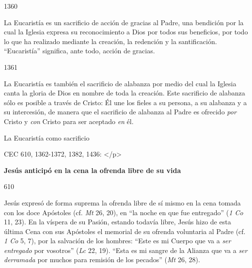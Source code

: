 			\begin{ccebody}\begin{ccenumber}1360\end{ccenumber} La Eucaristía es un sacrificio de acción de gracias al Padre, una bendición por la cual la Iglesia expresa su reconocimiento a Dios por todos sus beneficios, por todo lo que ha realizado mediante la creación, la redención y la santificación. “Eucaristía” significa, ante todo, acción de gracias.\end{ccebody}
			
			\begin{ccebody}\begin{ccenumber}1361\end{ccenumber} La Eucaristía es también el sacrificio de alabanza por medio del cual la Iglesia canta la gloria de Dios en nombre de toda la creación. Este sacrificio de alabanza sólo es posible a través de Cristo: Él une los fieles a su persona, a su alabanza y a su intercesión, de manera que el sacrificio de alabanza al Padre es ofrecido \textit{por} Cristo y \textit{con} Cristo para ser aceptado \textit{en }él.\end{ccebody}
			
			\begin{ccetheme}La Eucaristía como sacrificio \end{ccetheme}
			
			\begin{ccereference}\end{ccereference}CEC 610, 1362-1372, 1382, 1436: </p>
			
			\begin{ccebody}\textbf{Jesús anticipó en la cena la ofrenda libre de su vida}\end{ccebody}
			
			\begin{ccebody}\begin{ccenumber}610\end{ccenumber} Jesús expresó de forma suprema la ofrenda libre de sí mismo en la cena tomada con los doce Apóstoles (cf. \textit{Mt} 26, 20), en “la noche en que fue entregado” (\textit{1 Co} 11, 23). En la víspera de su Pasión, estando todavía libre, Jesús hizo de esta última Cena con sus Apóstoles el memorial de su ofrenda voluntaria al Padre (cf. \textit{1 Co} 5, 7), por la salvación de los hombres: “Este es mi Cuerpo que va a \textit{ser entregado} por vosotros” (\textit{Lc} 22, 19). “Esta es mi sangre de la Alianza que va a \textit{ser derramada} por muchos para remisión de los pecados” (\textit{Mt} 26, 28).\end{ccebody}
			
